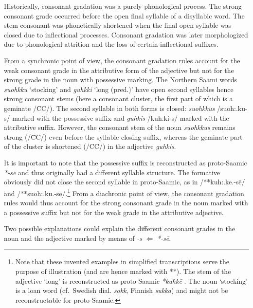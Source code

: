 {Historically, consonant gradation was a purely phonological process. The strong consonant grade occurred before the open final syllable of a disyllabic word. The stem consonant was phonetically shortened when the final open syllable was closed due to inflectional processes. Consonant gradation was later morphologized due to phonological attrition and the loss of certain inflectional suffixes.

From a synchronic point of view, the consonant gradation rules account for the weak consonant grade in the attributive form of the adjective but not for the strong grade in the noun with possessive marking. The Northern Saami words \textit{suohkku} ‘stocking’ and \textit{guhkki} ‘long (pred.)’ have open second syllables hence strong consonant stems (here a consonant cluster, the first part of which is a geminate /\=CC/). The second syllable in both forms is closed: \textit{suohkkus} /suoh:.ku-s/ marked with the possessive suffix and \textit{guhkis} /kuh.ki-s/ marked with the attributive suffix. However, the consonant stem of the noun \textit{suohkkus} remains strong (/\=CC/) even before the syllable closing suffix, whereas the geminate part of the cluster is shortened (/CC/) in the adjective \textit{guhkis}.

It is important to note that the possessive suffix is reconstructed as proto-Saamic \textit{*-sē} \cite[73]{sammallahti1998b} and thus originally had a different syllable structure. The formative obviously did not close the second syllable in proto-Saamic, as in /**kuh:.ke.-sē/ and /**suoh:.ku.-sē/.\footnote{Note that these invented examples in simplified transcriptions serve the purpose of illustration (and are hence marked with **). The stem of the adjective ‘long’ is reconstructed as proto-Saamic \textit{*ku\`{h}kē} \cite[246]{sammallahti1998b}. The noun ‘stocking’ is a loan word (cf.~Swedish dial. \textit{sokk}, Finnish \textit{sukka}) and might not be reconstructable for proto-Saamic.} From a diachronic point of view, the consonant gradation rules would thus account for the strong consonant grade in the noun marked with a possessive suffix but not for the weak grade in the attributive adjective.
 
Two possible explanations could explain the different consonant grades in the noun and the adjective marked by means of \textit{-s} $\Leftarrow$ \textit{*-sē}.

}
